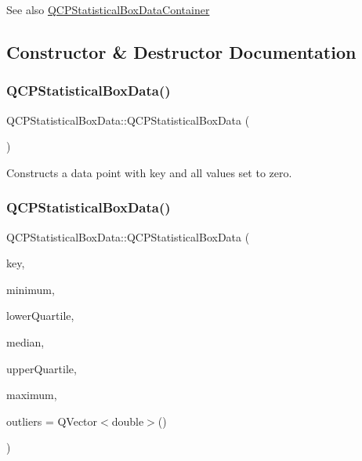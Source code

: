 \begin{DoxySeeAlso}{See also}
\hyperlink{qcustomplot_8h_a8b773c0c35f8f924701ced6e9915e4c7}{Q\+C\+P\+Statistical\+Box\+Data\+Container} 
\end{DoxySeeAlso}


\subsection{Constructor \& Destructor Documentation}
\mbox{\label{class_q_c_p_statistical_box_data_ab96c4b93670a8dcac8a3d4080fd722ee}} 
\subsubsection{\texorpdfstring{Q\+C\+P\+Statistical\+Box\+Data()}{QCPStatisticalBoxData()}\hspace{0.1cm}{\footnotesize\ttfamily [1/2]}}
{\footnotesize\ttfamily Q\+C\+P\+Statistical\+Box\+Data\+::\+Q\+C\+P\+Statistical\+Box\+Data (\begin{DoxyParamCaption}{ }\end{DoxyParamCaption})}

Constructs a data point with key and all values set to zero. \mbox{\label{class_q_c_p_statistical_box_data_a66b0c6d39765d0feb49c286fba4e4ef5}} 
\subsubsection{\texorpdfstring{Q\+C\+P\+Statistical\+Box\+Data()}{QCPStatisticalBoxData()}\hspace{0.1cm}{\footnotesize\ttfamily [2/2]}}
{\footnotesize\ttfamily Q\+C\+P\+Statistical\+Box\+Data\+::\+Q\+C\+P\+Statistical\+Box\+Data (\begin{DoxyParamCaption}\item[{double}]{key,  }\item[{double}]{minimum,  }\item[{double}]{lower\+Quartile,  }\item[{double}]{median,  }\item[{double}]{upper\+Quartile,  }\item[{double}]{maximum,  }\item[{const Q\+Vector$<$ double $>$ \&}]{outliers = {\ttfamily QVector$<$double$>$()} }\end{DoxyParamCaption})}

